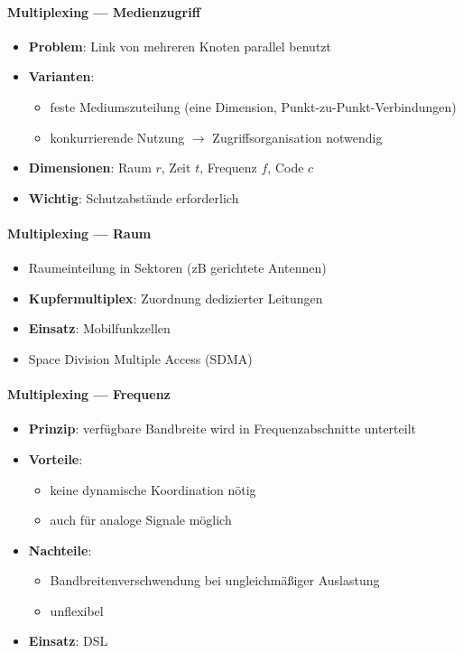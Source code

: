 \paragraph{Multiplexing --- Medienzugriff}
\begin{itemize}
  \item \textbf{Problem}: Link von mehreren Knoten parallel benutzt
  \item \textbf{Varianten}:
  \begin{itemize}
    \item feste Mediumszuteilung (eine Dimension, Punkt-zu-Punkt-Verbindungen)
    \item konkurrierende Nutzung \( \to \) Zugriffsorganisation notwendig
  \end{itemize}
  \item \textbf{Dimensionen}: Raum \( r \), Zeit \( t \), Frequenz \( f \), Code \( c \)
  \item \textbf{Wichtig}: Schutzabstände erforderlich
\end{itemize}

\paragraph{Multiplexing --- Raum}
\begin{itemize}
  \item Raumeinteilung in Sektoren (zB gerichtete Antennen)
  \item \textbf{Kupfermultiplex}: Zuordnung dedizierter Leitungen
  \item \textbf{Einsatz}: Mobilfunkzellen
  \item Space Division Multiple Access (SDMA)
\end{itemize}

\paragraph{Multiplexing --- Frequenz}
\begin{itemize}
  \item \textbf{Prinzip}: verfügbare Bandbreite wird in Frequenzabschnitte unterteilt
  \item \textbf{Vorteile}:
  \begin{itemize}
    \item keine dynamische Koordination nötig
    \item auch für analoge Signale möglich
  \end{itemize}
  \item \textbf{Nachteile}:
  \begin{itemize}
    \item Bandbreitenverschwendung bei ungleichmäßiger Auslastung
    \item unflexibel
  \end{itemize}
  \item \textbf{Einsatz}: DSL
\end{itemize}

